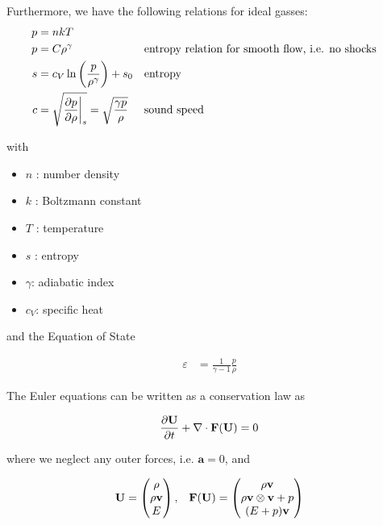 Furthermore, we have the following relations for ideal gasses:
\begin{align}
	p &= n k T \\
	p &= C \rho ^ \gamma && \text{entropy relation for smooth flow, i.e. no shocks} \\
	s &= c_V \ln \left( \frac{p}{\rho^\gamma} \right) + s_0 && \text{entropy}\\
	c &= \sqrt{\frac{\partial p}{\partial \rho} \bigg{|}_s } = \sqrt{\frac{\gamma p}{\rho}} && \text{sound speed}
\end{align}

with 
\begin{itemize}
	\item $n$ : number density
	\item $k$ : Boltzmann constant
	\item $T$ : temperature
	\item $s$ : entropy
	\item $\gamma$: adiabatic index
	\item $c_V$: specific heat 
\end{itemize}

and the Equation of State

\begin{align}
	\varepsilon &= \frac{1}{\gamma - 1}\frac{p}{\rho}
\end{align}




The Euler equations can be written as a conservation law as

\begin{align}
    \frac{\partial  \mathbf{U} }{\partial t} + \nabla \cdot \mathbf{F}(\mathbf{U}) = 0
\end{align}

where we neglect any outer forces, i.e. $\mathbf{a} = 0$, and 


\begin{align}
	\mathbf{U} = 
		\begin{pmatrix}
			\rho \\ \rho \mathbf{v} \\ E
		\end{pmatrix}, &&
	\mathbf{F}(\mathbf{U}) = 
		\begin{pmatrix}
			\rho \mathbf{v}\\
			\rho \mathbf{v} \otimes \mathbf{v} + p\\
			(E + p) \mathbf{v}
		\end{pmatrix}
\end{align}









